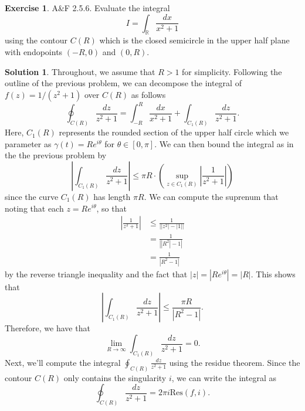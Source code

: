 \documentclass[12pt]{article}
\newcommand{\bbR}{\mathbb{R}}
\newcommand{\abs}[1]{ \left| #1 \right| }
\newcommand{\Res}{\text{Res}}
\theoremstyle{definition}
\newtheorem{exer}{Exercise}
\newtheorem{sol}{Solution}
\theoremstyle{remark}
\begin{document}
\newpage

\begin{exer}
    A\&F 2.5.6. Evaluate the integral
    \begin{equation}
        I = \int_\bbR \frac{dx}{x^2+1}
    \end{equation}
    using the contour $C(R)$ which is the closed semicircle in the upper half plane with endopoints $(-R, 0)$ and $(0,R)$.
\end{exer}
\begin{sol}
Throughout, we assume that $R>1$ for simplicity. Following the outline of the previous problem, we can decompose the integral of $f(z)=1/(z^2+1)$ over $C(R)$ as follows
\begin{equation}
    \oint_{C(R)} \frac{dz}{z^2 + 1} = \int_{-R}^{R} \frac{dx}{x^2+1} + \int_{C_1(R)}  \frac{dz}{z^2 + 1}.
\end{equation}
Here, $C_1(R)$ represents the rounded section of the upper half circle which we parameter as $\gamma(t) = Re^{i\theta}$ for $\theta\in[0, \pi]$. We can then bound the integral as in the the previous problem by
\begin{equation}
    \abs{\int_{C_1(R)} \frac{dz}{z^2 + 1}} \leq \pi R \cdot \left( \sup_{z\in C_1(R)} \abs{\frac{1}{z^2 + 1}}\right)
\end{equation}
since the curve $C_1(R)$ has length $\pi R$. We can compute the suprenum that noting that each $z=Re^{i\theta}$, so that
\begin{align}
    \abs{ \frac{1}{z^2 + 1}} &\leq \frac{1}{\abs{\abs{z^2}-\abs{1}}}\\
    &= \frac{1}{\abs{\abs{R^2} - 1}}\\
    &= \frac{1}{\abs{R^2 -1}}
\end{align}
by the reverse triangle inequality and the fact that $\abs{z} = \abs{Re^{i\theta}} = \abs{R}$. This shows that
\begin{equation}
       \abs{\int_{C_1(R)} \frac{dz}{z^2 + 1}} \leq \frac{\pi R}{\abs{R^2 -1}}.
\end{equation}
Therefore, we have that 
\begin{equation}
    \lim\limits_{R\to\infty} \int_{C_1(R)} \frac{dz}{z^2 + 1} = 0.
\end{equation}
Next, we'll compute the integral $ \oint_{C(R)} \frac{dz}{z^2 + 1}$ using the residue theorem. Since the contour $C(R)$ only contains the singularity $i$, we can write the integral as 
\begin{equation}
    \oint_{C(R)} \frac{dz}{z^2 + 1} = 2\pi i \Res(f, i).
\end{equation}


\end{sol}
\end{document}
